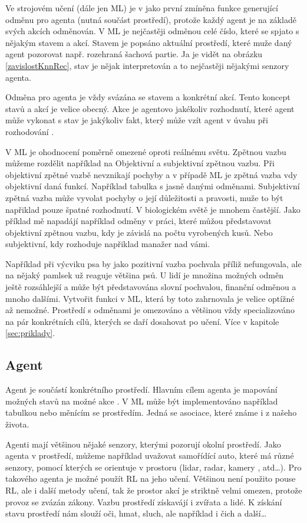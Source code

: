\documentclass{article}
\begin{document}
Ve strojovém učení (dále jen ML) je v \cite{sutton1999reinforcement} jako první zmíněna funkce generující odměnu pro agenta (nutná součást prostředí), protože každý agent je na základě svých akcích odměnován. V ML je nejčastěji odměnou celé číslo, které se spjato s nějakým stavem a akcí. Stavem je popsáno aktuální prostředí, které muže daný agent pozorovat např. rozehraná šachová partie. Ja je vidět na obrázku \ref{zavislostKnnRec}, stav je nějak interpretován a to nejčastěji nějakými senzory agenta.
 

Odměna pro agenta je vždy svázána se stavem a konkrétní akcí. Tento koncept stavů a akcí je velice obecný. Akce je  agentovo jakékoliv rozhodnutí, které agent může vykonat s stav je jakýkoliv fakt, který může vzít agent v úvahu při rozhodování \cite{sutton1999reinforcement}. 

V ML je ohodnocení poměrně omezené oproti reálnému světu. Zpětnou vazbu můžeme rozdělit například na Objektivní a subjektivní zpětnou vazbu. Při objektivní zpětné vazbě nevznikají pochyby a v případě ML je zpětná vazba vdy objektivní daná funkcí. Například tabulka s jasně danými odměnami. Subjektivní zpětná vazba může vyvolat pochyby o její důležitosti a pravosti, muže to být napřiklad pouze špatné rozhodnutí. V biologickém světě je mnohem častější. Jako příklad mě napadájí například odměny v práci, které můžou představovat objektivní zpětnou vazbu, kdy je závislá na počtu vyrobených kusů. Nebo subjektivní, kdy rozhoduje napřiklad manažer nad vámi.

Například při výcviku psa by jako pozitivní vazba pochvala příliž nefungovala, ale na nějaký pamlsek už reaguje většina psů. U lidí je množina možných odměn ještě rozsáhlejší a může být představována slovní pochvalou, finanční odměnou a mnoho dalšími. Vytvořit funkci v ML, která by toto zahrnovala je velice optížné až nemožné. Prostředí s odměnami je omezováno a většinou vždy specializováno na pár konkrétních cílů, kterých se daří dosahovat po učení. Více v kapitole \ref{sec:priklady}.


\subsection{Agent}
Agent je součástí konkrétního prostředí. Hlavním cílem agenta je mapování možných stavů na možné akce \cite{sutton1999reinforcement}. V ML může být implementováno například tabulkou nebo měnícím se prostředím. Jedná se asociace, které známe i z našeho života. 

Agenti mají většinou nějaké senzory, kterými pozorují okolní prostředí. Jako agenta v prostředí, můžeme například uvažovat samořídící auto, které má různé senzory, pomocí kterých se orientuje v prostoru (lidar, radar, kamery , atd\dots). Pro takového agenta je možné použít RL na jeho učení. Většinou není použito pouse RL, ale i další metody učení, tak že prostor akcí je striktně velmi omezen, protože provoz se zvázán zákony. Vazbu prostředí získavájí i zvířata a lidé. K získání stavu prostředí nám slouží oči, hmat, sluch, ale například i čich a další\dots 
\end{document}
